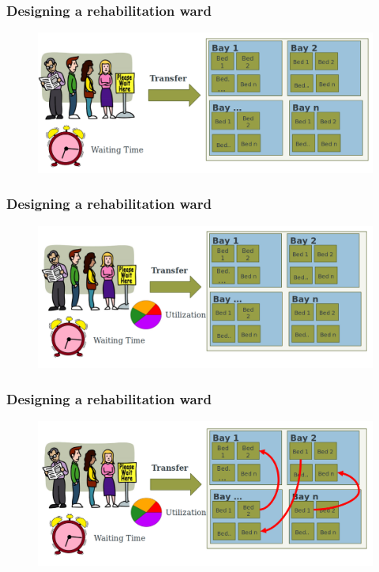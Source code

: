 \documentclass[aspectratio=169]{beamer}
\begin{document}
\begin{frame}
\frametitle{Designing a rehabilitation ward}
\begin{figure}
\includegraphics[width=1.0\linewidth]{ward3.png}
\end{figure}
\end{frame}



\begin{frame}
\frametitle{Designing a rehabilitation ward}
\begin{figure}
\includegraphics[width=1.0\linewidth]{ward4.png}
\end{figure}
\end{frame}



\begin{frame}
\frametitle{Designing a rehabilitation ward}
\begin{figure}
\includegraphics[width=1.0\linewidth]{ward5.png}
\end{figure}
\end{frame}
\end{document}
